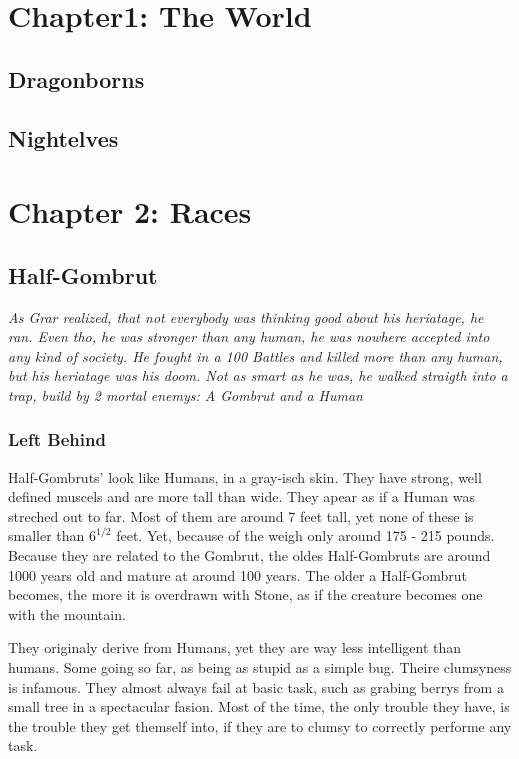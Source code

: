\documentclass[10pt,twoside,twocolumn,openany]{book}
\begin{document}
\selectfont %


\newpage


\tableofcontents
\newpage

\chapter{Chapter1: The World}

\newpage
\section{Dragonborns}

\newpage
\section{Nightelves}


\chapter{Chapter 2: Races}
\section{Half-Gombrut}
\textit{As Grar realized, that not everybody was thinking good about his heriatage, he ran. Even tho, he was  stronger than any human, he was nowhere accepted into any kind of  society. He fought in a 100 Battles and killed more than any human, but his heriatage was his doom. Not as smart as he was, he walked straigth into a trap, build by 2 mortal enemys: A Gombrut and a Human}

\subsection{Left Behind}
Half-Gombruts' look like Humans, in a gray-isch skin. They have strong, well defined muscels and are more tall than wide. They apear as if a Human was streched out to far. Most of them are around 7 feet tall, yet none of these is smaller  than $6^{1/2}$ feet. Yet, because of the weigh only around 175 - 215 pounds. Because they are related to the Gombrut, the oldes Half-Gombruts are around 1000 years old and mature at around 100 years. The older a Half-Gombrut becomes, the more it is overdrawn with Stone, as if the creature becomes one with the mountain.

They originaly derive from Humans, yet they are way less intelligent than humans. Some going so far, as being as stupid as a simple bug. Theire clumsyness is infamous. They almost always fail at basic task, such as grabing berrys from a small tree in a spectacular fasion. Most of the time, the only trouble they have, is the trouble they get themself into, if they are to clumsy to correctly performe any task.
\end{document}

